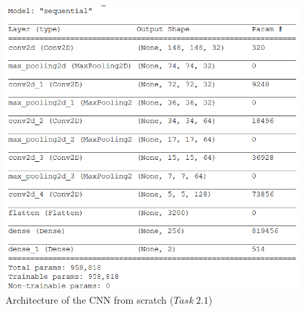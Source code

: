 \documentclass[11pt,a4paper,oneside]{article}
\begin{document}
\begin{figure}[h]
\centering
\includegraphics[width=.5\textwidth]{images/scratch_model}
\caption{Architecture of the CNN from scratch ($Task\ 2.1$)}
\label{fig:scratch_model}
\end{figure}
\end{document}
